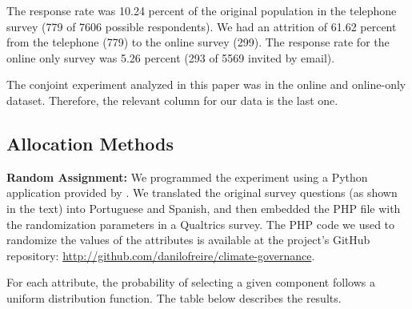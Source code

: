 \documentclass[12pt,a4paper,]{article}
\begin{document}
The response rate was 10.24 percent of the original population in the
telephone survey (779 of 7606 possible respondents). We had an attrition
of 61.62 percent from the telephone (779) to the online survey (299).
The response rate for the online only survey was 5.26 percent (293 of
5569 invited by email).

The conjoint experiment analyzed in this paper was in the online and
online-only dataset. Therefore, the relevant column for our data is the
last one.

\hypertarget{allocation-methods}{%
\subsection{Allocation Methods}\label{allocation-methods}}

\textbf{Random Assignment:} We programmed the experiment using a Python
application provided by \citet{strezhnev2013conjoint}. We translated the
original survey questions (as shown in the text) into Portuguese and
Spanish, and then embedded the PHP file with the randomization
parameters in a Qualtrics survey. The PHP code we used to randomize the
values of the attributes is available at the project's GitHub
repository: \url{http://github.com/danilofreire/climate-governance}.

For each attribute, the probability of selecting a given component
follows a uniform distribution function. The table below describes the
results.

\vspace{.5cm}
\end{document}
